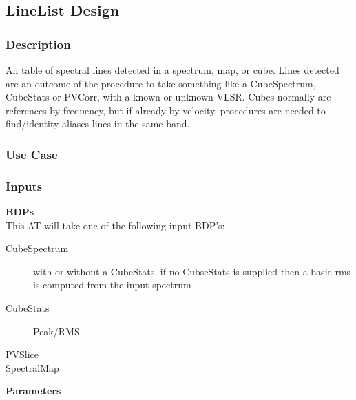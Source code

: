 \subsection{LineList Design}

\subsubsection{Description}
An table of spectral lines detected in a spectrum, map, or cube.
Lines detected are an outcome of the procedure to take something
like a CubeSpectrum, CubeStats or PVCorr, with a known or unknown VLSR.
Cubes normally are references by frequency, but if already by velocity,
procedures are needed to find/identity aliases lines in the same band.

\subsubsection{Use Case}

\subsubsection{Inputs}
{\bf BDPs}\\
This AT will take one of the following input BDP's:
\begin{description}
\item[CubeSpectrum] with or without a CubeStats, if no CubseStats is supplied then a basic rms is computed from the input spectrum
\item[CubeStats] Peak/RMS
\item[PVSlice]
\item[SpectralMap]
\end{description}

{\bf Parameters}\\
\begin{description}
\item[]
\end{description}

